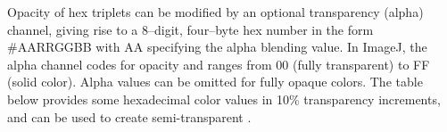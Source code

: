\begin{infobox}
Opacity of hex triplets can be modified by an optional transparency
(alpha) channel, giving rise to a 8--digit, four--byte hex number
in the form \#AARRGGBB with AA specifying the alpha
blending value. In ImageJ, the alpha channel codes for opacity and
ranges from 00 (fully transparent) to FF (solid color). Alpha values
can be omitted for fully opaque colors. The table below provides some
hexadecimal color values in 10\% transparency increments, and can
be used to create semi-transparent .

\noindent \begin{centering}
\vspace*{\medskipamount}

\par\end{centering}


\end{infobox}
